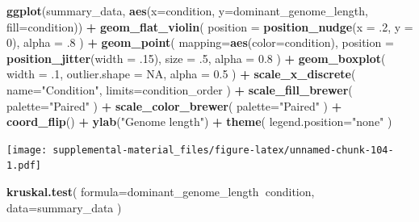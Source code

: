 \documentclass[]{book}
\newenvironment{Shaded}{\begin{snugshade}}{\end{snugshade}}
\newcommand{\DataTypeTok}[1]{\textcolor[rgb]{0.13,0.29,0.53}{#1}}
\newcommand{\DecValTok}[1]{\textcolor[rgb]{0.00,0.00,0.81}{#1}}
\newcommand{\FloatTok}[1]{\textcolor[rgb]{0.00,0.00,0.81}{#1}}
\newcommand{\KeywordTok}[1]{\textcolor[rgb]{0.13,0.29,0.53}{\textbf{#1}}}
\newcommand{\NormalTok}[1]{#1}
\newcommand{\OperatorTok}[1]{\textcolor[rgb]{0.81,0.36,0.00}{\textbf{#1}}}
\newcommand{\OtherTok}[1]{\textcolor[rgb]{0.56,0.35,0.01}{#1}}
\newcommand{\StringTok}[1]{\textcolor[rgb]{0.31,0.60,0.02}{#1}}
\begin{document}
\begin{Shaded}
\begin{Highlighting}[]
\KeywordTok{ggplot}\NormalTok{(summary_data, }\KeywordTok{aes}\NormalTok{(}\DataTypeTok{x=}\NormalTok{condition, }\DataTypeTok{y=}\NormalTok{dominant_genome_length, }\DataTypeTok{fill=}\NormalTok{condition)) }\OperatorTok{+}
\StringTok{  }\KeywordTok{geom_flat_violin}\NormalTok{(}
    \DataTypeTok{position =} \KeywordTok{position_nudge}\NormalTok{(}\DataTypeTok{x =} \FloatTok{.2}\NormalTok{, }\DataTypeTok{y =} \DecValTok{0}\NormalTok{),}
    \DataTypeTok{alpha =} \FloatTok{.8}
\NormalTok{  ) }\OperatorTok{+}
\StringTok{  }\KeywordTok{geom_point}\NormalTok{(}
    \DataTypeTok{mapping=}\KeywordTok{aes}\NormalTok{(}\DataTypeTok{color=}\NormalTok{condition),}
    \DataTypeTok{position =} \KeywordTok{position_jitter}\NormalTok{(}\DataTypeTok{width =} \FloatTok{.15}\NormalTok{),}
    \DataTypeTok{size =} \FloatTok{.5}\NormalTok{,}
    \DataTypeTok{alpha =} \FloatTok{0.8}
\NormalTok{  ) }\OperatorTok{+}
\StringTok{  }\KeywordTok{geom_boxplot}\NormalTok{(}
    \DataTypeTok{width =} \FloatTok{.1}\NormalTok{,}
    \DataTypeTok{outlier.shape =} \OtherTok{NA}\NormalTok{,}
    \DataTypeTok{alpha =} \FloatTok{0.5}
\NormalTok{  ) }\OperatorTok{+}
\StringTok{  }\KeywordTok{scale_x_discrete}\NormalTok{(}
    \DataTypeTok{name=}\StringTok{"Condition"}\NormalTok{,}
    \DataTypeTok{limits=}\NormalTok{condition_order}
\NormalTok{  ) }\OperatorTok{+}
\StringTok{  }\KeywordTok{scale_fill_brewer}\NormalTok{(}
    \DataTypeTok{palette=}\StringTok{"Paired"}
\NormalTok{  ) }\OperatorTok{+}
\StringTok{  }\KeywordTok{scale_color_brewer}\NormalTok{(}
    \DataTypeTok{palette=}\StringTok{"Paired"}
\NormalTok{  ) }\OperatorTok{+}
\StringTok{  }\KeywordTok{coord_flip}\NormalTok{() }\OperatorTok{+}
\StringTok{  }\KeywordTok{ylab}\NormalTok{(}\StringTok{"Genome length"}\NormalTok{) }\OperatorTok{+}
\StringTok{  }\KeywordTok{theme}\NormalTok{(}
    \DataTypeTok{legend.position=}\StringTok{"none"}
\NormalTok{  )}
\end{Highlighting}
\end{Shaded}

\texttt{[image: supplemental-material\_files/figure-latex/unnamed-chunk-104-1.pdf]}

\begin{Shaded}
\begin{Highlighting}[]
\KeywordTok{kruskal.test}\NormalTok{(}
  \DataTypeTok{formula=}\NormalTok{dominant_genome_length}\OperatorTok{~}\NormalTok{condition,}
  \DataTypeTok{data=}\NormalTok{summary_data}
\NormalTok{)}
\end{Highlighting}
\end{Shaded}
\end{document}
